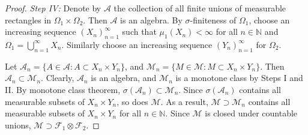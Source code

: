 \documentclass{article}
\numberwithin{equation}{section}
\theoremstyle{plain}
\theoremstyle{definition}
\begin{document}
\begin{proof}
\item\textit{Step IV:} Denote by $\mathscr{A}$ the collection of all finite unions of measurable rectangles in $\Omega_1\times\Omega_2$. Then $\mathscr{A}$ is an algebra. By $\sigma$-finiteness of $\Omega_1$, choose an increasing sequence $(X_n)_{n=1}^\infty$ such that $\mu_1(X_n)<\infty$ for all $n\in\mathbb{N}$ and $\Omega_1=\bigcup_{n=1}^\infty X_n$. Similarly choose an increasing sequence $(Y_n)_{n=1}^\infty$ for $\Omega_2$.

Let $\mathscr{A}_n=\{A\in\mathscr{A}:A\subset X_n\times Y_n\}$, and $\mathscr{M}_n=\{M\in\mathscr{M}:M\subset X_n\times Y_n\}$. Then $\mathscr{A}_n\subset\mathscr{M}_n$. Clearly, $\mathscr{A}_n$ is an algebra, and $\mathscr{M}_n$ is a monotone class by Steps I and II. By monotone class theorem, $\sigma(\mathscr{A}_n)\subset\mathscr{M}_n$. Since $\sigma(\mathscr{A}_n)$ contains all measurable subsets of $X_n\times Y_n$, so does $\mathscr{M}$. As a result, $\mathscr{M}\supset\mathscr{M}_n$ contains all measurable subsets of $X_n\times Y_n$ for all $n\in\mathbb{N}$. Since $\mathscr{M}$ is closed under countable unions, $\mathscr{M}\supset\mathscr{F}_1\otimes\mathscr{F}_2$.
\end{proof}
\end{document}

